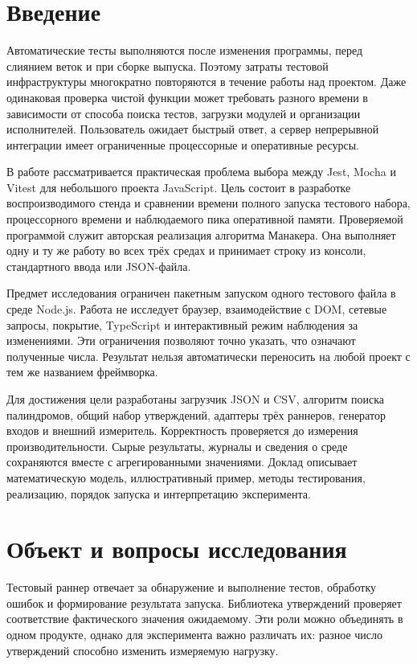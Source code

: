 \section{Введение}
Автоматические тесты выполняются после изменения программы, перед слиянием веток и при сборке выпуска. Поэтому затраты тестовой инфраструктуры многократно повторяются в течение работы над проектом. Даже одинаковая проверка чистой функции может требовать разного времени в зависимости от способа поиска тестов, загрузки модулей и организации исполнителей. Пользователь ожидает быстрый ответ, а сервер непрерывной интеграции имеет ограниченные процессорные и оперативные ресурсы.

В работе рассматривается практическая проблема выбора между Jest, Mocha и Vitest для небольшого проекта JavaScript. Цель состоит в разработке воспроизводимого стенда и сравнении времени полного запуска тестового набора, процессорного времени и наблюдаемого пика оперативной памяти. Проверяемой программой служит авторская реализация алгоритма Манакера. Она выполняет одну и ту же работу во всех трёх средах и принимает строку из консоли, стандартного ввода или JSON-файла.

Предмет исследования ограничен пакетным запуском одного тестового файла в среде Node.js. Работа не исследует браузер, взаимодействие с DOM, сетевые запросы, покрытие, TypeScript и интерактивный режим наблюдения за изменениями. Эти ограничения позволяют точно указать, что означают полученные числа. Результат нельзя автоматически переносить на любой проект с тем же названием фреймворка.

Для достижения цели разработаны загрузчик JSON и CSV, алгоритм поиска палиндромов, общий набор утверждений, адаптеры трёх раннеров, генератор входов и внешний измеритель. Корректность проверяется до измерения производительности. Сырые результаты, журналы и сведения о среде сохраняются вместе с агрегированными значениями. Доклад описывает математическую модель, иллюстративный пример, методы тестирования, реализацию, порядок запуска и интерпретацию эксперимента.

\section{Объект и вопросы исследования}
Тестовый раннер отвечает за обнаружение и выполнение тестов, обработку ошибок и формирование результата запуска. Библиотека утверждений проверяет соответствие фактического значения ожидаемому. Эти роли можно объединять в одном продукте, однако для эксперимента важно различать их: разное число утверждений способно изменить измеряемую нагрузку.

